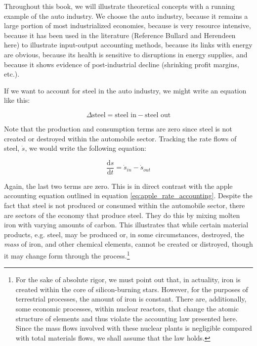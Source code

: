 
Throughout this book, we will illustrate theoretical concepts with
a running example of the auto industry. We choose the auto industry,
because it remains a large portion of most industrialized economies, 
because is very resource intensive,
because it has been used in the literature (Reference Bullard and Herendeen here)
to illustrate input-output accounting methods, 
because its links with energy are obvious,
because its health is sensitive to disruptions in energy supplies, and
because it shows evidence of post-industrial decline (shrinking profit margins, etc.).

If we want to account for steel in the auto industry, 
we might write an equation like this:

\begin{equation}
	\Delta\textrm{steel} 
	= \textrm{steel in} 
	- \textrm{steel out} 
\end{equation}

Note that the production and consumption terms are zero
since steel is not created or destroyed within the automobile
sector. Tracking the rate flows of steel, $\dot{s}$, we would write the following 
equation:

\begin{equation}
	\frac{\mathrm{d}s}{\mathrm{d}t}
	= \dot{s}_{in}
	- \dot{s}_{out}
\end{equation}

Again, the last two terms are zero. This is in direct contrast with the apple 
accounting equation outlined in equation \ref{eq:apple_rate_accounting}. Despite 
the fact that steel is not produced or consumed within the automobile sector, 
there are sectors of the economy that produce steel. They do this by mixing molten
iron with varying amounts of carbon. This illustrates that while certain material
products, e.g. steel, may be produced or, in some circumstances, destroyed, the
\emph{mass} of iron, and other chemical elements, cannot be created or distroyed,
though it may change form through the process.\footnote{For the sake of
absolute rigor, we must point out that, in actuality, iron is created within
the core of silicon-burning stars. However, for the purposes of terrestrial
processes, the amount of iron is constant. There are, additionally, some economic
processes, within nuclear reactors, that change the atomic structure of elements
and thus violate the accounting law presented here. Since the mass flows involved
with these nuclear plants is negligible compared with total materials flows, we
shall assume that the law holds.} 



